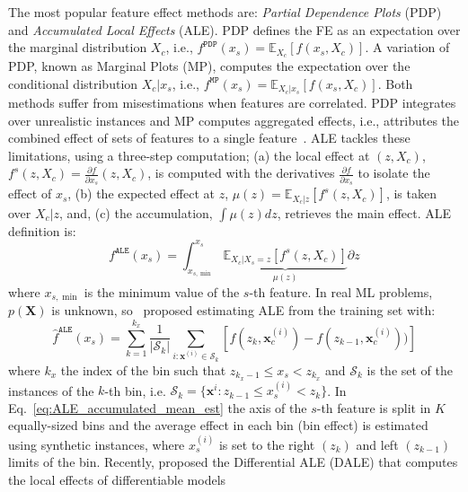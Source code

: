 \documentclass{ecai}  %
\newcommand{\xc}{\mathbf{x}_c}
\newcommand{\xb}{\mathbf{x}}
\begin{document}
The most popular feature effect methods are: \emph{Partial Dependence
  Plots} (PDP) and \emph{Accumulated Local Effects} (ALE).  PDP
defines the FE as an expectation over the marginal distribution
\(X_c\), i.e.,
\(f^{\mathtt{PDP}}(x_s) = \mathbb{E}_{X_c}[f(x_s,X_c)]\).  A variation
of PDP, known as Marginal Plots (MP), computes the expectation over
the conditional distribution \(X_c|x_s\), i.e.,
\(f^{\mathtt{MP}}(x_s) = \mathbb{E}_{X_c|x_s}[f(x_s, X_c)]\).  Both
methods suffer from misestimations when features are correlated.  PDP
integrates over unrealistic instances and MP computes aggregated
effects, i.e., attributes the combined effect of sets of features to a
single feature~\cite{apley2020visualizing}. ALE tackles these
limitations, using a three-step computation; (a) the local effect at
\((z, X_c)\),
\(f^s(z, X_c) = \frac{\partial f}{\partial x_s} (z, X_c)\), is
computed with the derivatives $\frac{\partial f}{\partial x_s}$ to
isolate the effect of $x_s$, (b) the expected effect at \(z\),
\(\mu(z) = \mathbb{E}_{X_c|z}\left [f^s (z, X_c)\right ]\), is taken
over $X_c|z$, and, (c) the accumulation, $\int \mu(z) dz $, retrieves
the main effect.  ALE definition is:
%
\begin{equation}
  \label{eq:ALE}
  f^{\mathtt{ALE}}(x_s) = \int_{x_{s,\min}}^{x_s} \underbrace{\mathbb{E}_{X_c|X_s=z}\left [f^s (z, X_c)\right ]}_{\mu(z)} \partial z
\end{equation}
%
where \(x_{s,\min}\) is the minimum value of the \(s\)-th feature.
In real ML problems, $p(\mathbf{X})$ is unknown, so~\cite{apley2020visualizing} proposed estimating ALE
from the training set with:
%
\begin{equation}
  \label{eq:ALE_accumulated_mean_est}
  \hat{f}^{\mathtt{ALE}}(x_s) = \sum_{k=1}^{k_x} \frac{1}{|\mathcal{S}_k|} \sum_{i:\mathbf{x}^{(i)} \in
    \mathcal{S}_k} \left [ f(z_{k}, \xc^{(i)}) - f(z_{k-1}, \xc^{(i)})) \right ]
\end{equation}
%
where \(k_x\) the index of the bin such that
\(z_{k_x-1} \leq x_s < z_{k_x} \) and \(\mathcal{S}_k\)
is the set of the instances of the \(k\)-th bin, i.e.
\( \mathcal{S}_k = \{ \xb^i : z_{k-1} \leq x^{(i)}_s < z_{k} \} \).
In Eq.~\eqref{eq:ALE_accumulated_mean_est} the axis of the $s$-th feature
is split in \(K\) equally-sized bins and the
average effect in each bin (bin effect) is estimated using synthetic instances,
where $x^{(i)}_s$ is set to the right $(z_k)$ and left $(z_{k-1})$ limits of the bin.
Recently, \cite{gkolemis22} proposed the Differential ALE (DALE)
that computes the local effects of differentiable models
\end{document}
